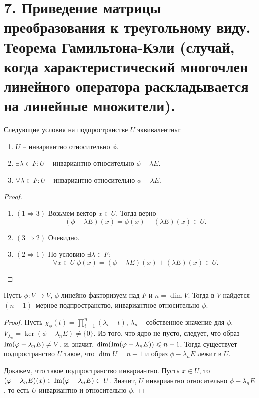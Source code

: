 \section{7. Приведение матрицы преобразования к треугольному виду. Теорема Гамильтона-Кэли (случай, когда характеристический многочлен линейного оператора раскладывается на линейные множители).}

\begin{proposition}
    \label{prop4.2}
    Следующие условия на подпространстве $U$ эквивалентны:
    \begin{enumerate}
        \item $U$ -- инвариантно относительно $\phi$.
        \item $\exists \lambda \in F: U$ -- инвариантно относительно $\phi - \lambda E$.
        \item  $\forall \lambda \in F: U$ -- инвариантно относительно $\phi - \lambda E$.
    \end{enumerate}
\end{proposition}

\begin{proof}~
    \begin{enumerate}
        \item $(1 \Rightarrow 3)$ Возьмем вектор $x \in U$. Тогда верно
        $$(\phi - \lambda E)(x) = \phi(x) - (\lambda E)(x) \in U.$$
        \item $(3 \Rightarrow 2)$ Очевидно.
        \item $(2 \Rightarrow 1)$ По условию $\exists \lambda \in F:$
        $$\forall x \in U \; \phi(x) = (\phi - \lambda E)(x) + (\lambda E)(x) \in U.$$
    \end{enumerate}
\end{proof}

\begin{proposition}
    \label{utv4.3}
    Пусть $\phi: V \to V$, $\phi$ линейно факторизуем над $F$ и  $n = \dim V$. Тогда в $V$ найдется 
    $(n - 1)$--мерное подпространство, инвариантное относительно $\phi$.
\end{proposition}

\begin{proof}
    Пусть $\chi_{\phi}(t) = \prod_{i=1}^n (\lambda_i - t)$, $\lambda_n$ -- собственное значение для $\phi$, 
    $V_{\lambda_n} = \ker (\phi - \lambda_n E) \neq \{ \overline{0} \}$. Из того, что ядро не пусто, 
    следует, что образ $\operatorname{Im}(\varphi - \lambda_n E) \neq V$, и, значит, $\dim (\operatorname{Im}(\varphi - \lambda_n E)) \leqslant n - 1$. 
    Тогда существует подпространство $U$ такое, что $\dim U = n - 1$ и образ $\phi - \lambda_n E$ лежит в $U$. 
    
    Докажем, что такое подпространство инвариантно. Пусть $x \in U$, то $(\varphi - \lambda_n E)(x) \in \operatorname{Im}(\varphi - \lambda_n E) \subset U$. 
    Значит, $U$ инвариантно относительно $\phi - \lambda_n E$, то есть $U$ инвариантно и относительно $\phi$.
\end{proof}

